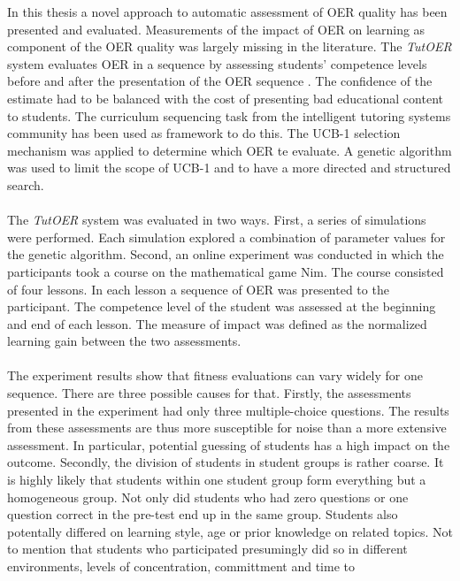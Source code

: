 
In this thesis a novel approach to automatic assessment of OER quality has been
presented and evaluated. Measurements of the impact of OER on learning as
component of the OER quality was largely missing in the literature. The
\emph{TutOER} system evaluates OER in a sequence by assessing students' competence levels
before and after the presentation of the OER sequence . The confidence of the estimate
had to be balanced with the cost of presenting bad educational content to
students. The curriculum sequencing task from the intelligent tutoring systems
community has been used as framework to do this. The UCB-1 selection mechanism
was applied to determine which OER te evaluate. A genetic algorithm was used
to limit the scope of UCB-1 and to have a more directed and structured
search.\\\\
\noindent
The \emph{TutOER} system was evaluated in two ways. First, a series of
simulations were performed. Each simulation explored a combination of parameter
values for the genetic algorithm. Second, an online experiment was conducted
in which the participants took a course on the mathematical game Nim. The
course consisted of four lessons. In each lesson a sequence of OER was
presented to the participant. The competence level of the student was assessed
at the beginning and end of each lesson. The measure of impact was defined as
the normalized learning gain between the two assessments.\\\\
\noindent
The experiment results show that fitness evaluations can vary widely for one
sequence. There are three possible causes for that. Firstly, the assessments
presented in the experiment had only three multiple-choice questions. The
results from these assessments are thus more susceptible for noise than a more
extensive assessment. In particular, potential guessing of students has a high
impact on the outcome. Secondly, the division of students in student groups is
rather coarse. It is highly likely that students within one student group form
everything but a homogeneous group. Not only did students who had zero
questions or one question correct in the pre-test end up in the same group.
Students also potentally differed on learning style, age or prior knowledge on
related topics. Not to mention that students who participated presumingly did
so in different environments, levels of concentration, committment and time to

